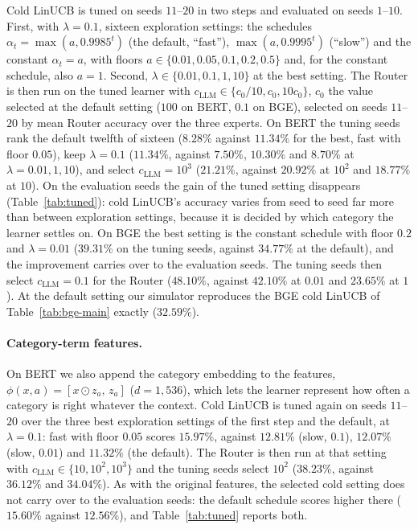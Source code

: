\documentclass[anon]{alt2027} %
\begin{document}
Cold LinUCB is tuned on seeds $11$--$20$ in two steps and evaluated on seeds
$1$--$10$. First, with $\lambda=0.1$, sixteen exploration settings: the
schedules $\alpha_t=\max(a,0.9985^t)$ (the default, ``fast''),
$\max(a,0.9995^t)$ (``slow'') and the constant $\alpha_t=a$, with floors
$a\in\{0.01,0.05,0.1,0.2,0.5\}$ and, for the constant schedule, also $a=1$.
Second, $\lambda\in\{0.01,0.1,1,10\}$ at the best setting. The Router is then
run on the tuned learner with $c_{\mathrm{LLM}}\in\{c_0/10,c_0,10c_0\}$, $c_0$ the value
selected at the default setting ($100$ on BERT, $0.1$ on BGE), selected on seeds $11$--$20$ by mean Router
accuracy over the three experts. On BERT the tuning seeds rank the default
twelfth of sixteen ($8.28\%$ against $11.34\%$ for the best, fast with floor
$0.05$), keep $\lambda=0.1$ ($11.34\%$, against $7.50\%$, $10.30\%$ and
$8.70\%$ at $\lambda=0.01,1,10$), and select $c_{\mathrm{LLM}}=10^3$ ($21.21\%$, against
$20.92\%$ at $10^2$ and $18.77\%$ at $10$). On the evaluation seeds the gain
of the tuned setting disappears (Table~\ref{tab:tuned}): cold LinUCB's
accuracy varies from seed to seed far more than between exploration settings,
because it is decided by which category the learner settles on. On BGE the
best setting is the constant schedule with floor $0.2$ and $\lambda=0.01$
($39.31\%$ on the tuning seeds, against $34.77\%$ at the default), and the
improvement carries over to the evaluation seeds. The tuning seeds then
select $c_{\mathrm{LLM}}=0.1$ for the Router ($48.10\%$, against $42.10\%$ at $0.01$ and
$23.65\%$ at $1$). At the default setting our simulator reproduces the BGE
cold LinUCB of Table~\ref{tab:bge-main} exactly ($32.59\%$).

\paragraph{Category-term features.} On BERT we also append the category
embedding to the features, $\phi(x,a)=[x\odot z_a,\,z_a]$ ($d=1{,}536$), which
lets the learner represent how often a category is right whatever the
context. Cold LinUCB is tuned again on seeds $11$--$20$ over the three best
exploration settings of the first step and the default, at $\lambda=0.1$: fast
with floor $0.05$ scores $15.97\%$, against $12.81\%$ (slow, $0.1$), $12.07\%$
(slow, $0.01$) and $11.32\%$ (the default). The Router is then run at that
setting with $c_{\mathrm{LLM}}\in\{10,10^2,10^3\}$ and the tuning seeds select $10^2$
($38.23\%$, against $36.12\%$ and $34.04\%$). As with the original features,
the selected cold setting does not carry over to the evaluation seeds: the
default schedule scores higher there ($15.60\%$ against $12.56\%$), and
Table~\ref{tab:tuned} reports both.
\end{document}
